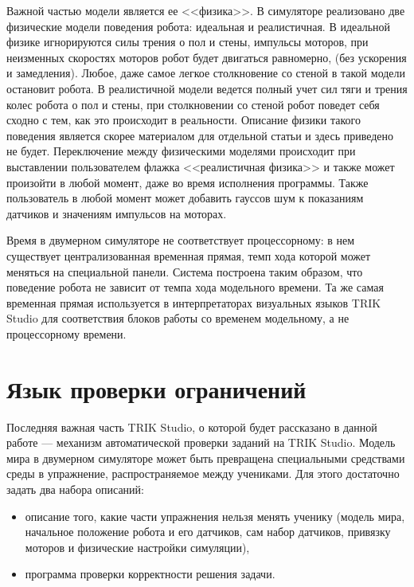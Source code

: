 \documentclass[a5paper]{article}
\begin{document}
Важной частью модели является ее <<физика>>. В симуляторе реализовано две физические модели поведения робота: идеальная и реалистичная. В идеальной физике игнорируются силы трения о пол и стены, импульсы моторов, при неизменных скоростях моторов робот будет двигаться равномерно, (без ускорения и замедления). Любое, даже самое легкое столкновение со стеной в такой модели остановит робота. В реалистичной модели ведется полный учет сил тяги и трения колес робота о пол и стены, при столкновении со стеной робот поведет себя сходно с тем, как это происходит в реальности. Описание физики такого поведения является скорее материалом для отдельной статьи и здесь приведено не будет. Переключение между физическими моделями происходит при выставлении пользователем флажка <<реалистичная физика>> и также может произойти в любой момент, даже во время исполнения программы. Также пользователь в любой момент может добавить гауссов шум к показаниям датчиков и значениям импульсов на моторах.

Время в двумерном симуляторе не соответствует процессорному: в нем существует централизованная временная прямая, темп хода которой может меняться на специальной панели. Система построена таким образом, что поведение робота не зависит от темпа хода модельного времени. Та же самая временная прямая используется в интерпретаторах визуальных языков TRIK Studio для соответствия блоков работы со временем модельному, а не процессорному времени.

\section{Язык проверки ограничений}
\label{chapter:constraintsChecker}

Последняя важная часть TRIK Studio, о которой будет рассказано в данной работе --- механизм автоматической проверки заданий на TRIK Studio. Модель мира в двумерном симуляторе может быть превращена специальными средствами среды в упражнение, распространяемое между учениками. Для этого достаточно задать два набора описаний:

\begin{itemize}
    \item описание того, какие части упражнения нельзя менять ученику (модель мира, начальное положение робота и его датчиков, сам набор датчиков, привязку моторов и физические настройки симуляции),
    \item программа проверки корректности решения задачи.
\end{itemize}
\end{document}
